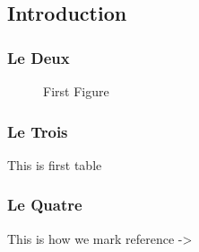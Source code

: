 \subsection{Introduction}
\subsubsection{Le Deux}
\begin{figure}[h!]
    \caption{First Figure}
\end{figure}
\subsubsection{Le Trois}
\begin{table}[h!]
    \caption{This is first table}
\end{table}
\subsubsection{Le Quatre}
This is how we mark reference ->\cite{MonkeyKing:1}
